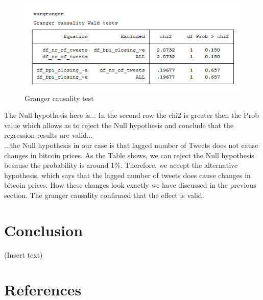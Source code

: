 \documentclass[a4paper,american,12pt]{article}
\begin{document}
\begin{spacing}{1.2}
\begin{figure}[H]
\centering
\includegraphics[scale=0.85]{stata_export_graphs/granger_test.png}
\caption{Granger causality test}
\label{fig:6}
\end{figure}

The Null hypothesis here is... In the second row the chi2 is greater then the Prob value which allows as to reject the Null hypothesis and conclude that the regression results are valid...\\

...the Null hypothesis in our case is that lagged number of Tweets does not cause changes in bitcoin prices. As the Table shows, we can reject the Null hypothesis because the probability is around 1\%. Therefore, we accept the alternative hypothesis, which says that the lagged number of tweets does cause changes in bitcoin prices. How these changes look exactly we have discussed in the previous section. The granger causality confirmed that the effect is valid.

\clearpage

\section{Conclusion}
\label{sec:Conclustion}
(Insert text)

\clearpage
		
\end{spacing}

\clearpage

\section{References}
\printbibliography[heading=none]

\clearpage

\end{document}

